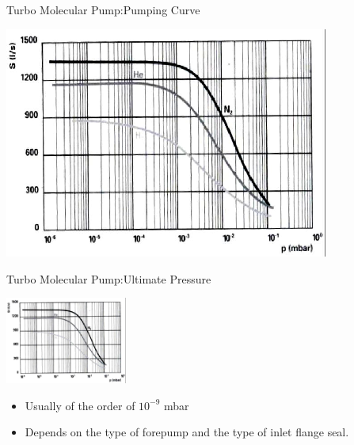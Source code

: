 \documentclass[11]{beamer}
\begin{document}
\begin{frame}{Turbo Molecular Pump:Pumping Curve}
\begin{center}
\includegraphics[width=0.8\textwidth]{turboPumpingCurve.png}
\end{center}
\end{frame}

\begin{frame}{Turbo Molecular Pump:Ultimate Pressure}

     \begin{center}
\includegraphics[width=0.3\textwidth]{turboPumpingCurve.png}
\end{center}
     
      \begin{itemize}
       \item Usually of the order of $10^{-9}$ mbar
       \item Depends on the type of forepump and the type of inlet flange seal.
       \end{itemize}
\end{frame}
\end{document}
